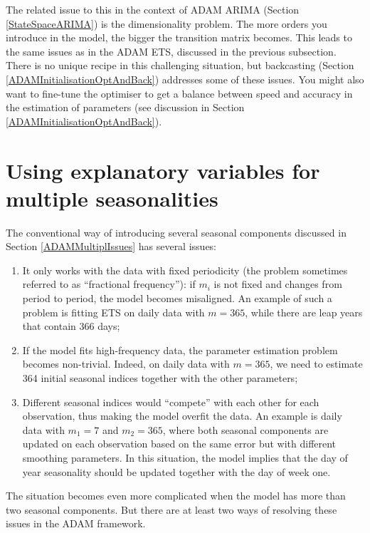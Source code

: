 \documentclass[
]{book}
\providecommand{\tightlist}{%
  \setlength{\itemsep}{0pt}\setlength{\parskip}{0pt}}
\theoremstyle{definition}
\theoremstyle{definition}
\theoremstyle{definition}
\theoremstyle{definition}
\theoremstyle{remark}
\begin{document}
The related issue to this in the context of ADAM ARIMA (Section \ref{StateSpaceARIMA}) is the dimensionality problem. The more orders you introduce in the model, the bigger the transition matrix becomes. This leads to the same issues as in the ADAM ETS, discussed in the previous subsection. There is no unique recipe in this challenging situation, but backcasting (Section \ref{ADAMInitialisationOptAndBack}) addresses some of these issues. You might also want to fine-tune the optimiser to get a balance between speed and accuracy in the estimation of parameters (see discussion in Section \ref{ADAMInitialisationOptAndBack}).

\hypertarget{ETSXMultipleSeasonality}{%
\section{Using explanatory variables for multiple seasonalities}\label{ETSXMultipleSeasonality}}

The conventional way of introducing several seasonal components discussed in Section \ref{ADAMMultiplIssues} has several issues:

\begin{enumerate}
\def\labelenumi{\arabic{enumi}.}
\tightlist
\item
  It only works with the data with fixed periodicity (the problem sometimes referred to as ``fractional frequency''): if \(m_i\) is not fixed and changes from period to period, the model becomes misaligned. An example of such a problem is fitting ETS on daily data with \(m=365\), while there are leap years that contain 366 days;
\item
  If the model fits high-frequency data, the parameter estimation problem becomes non-trivial. Indeed, on daily data with \(m=365\), we need to estimate 364 initial seasonal indices together with the other parameters;
\item
  Different seasonal indices would ``compete'' with each other for each observation, thus making the model overfit the data. An example is daily data with \(m_1=7\) and \(m_2=365\), where both seasonal components are updated on each observation based on the same error but with different smoothing parameters. In this situation, the model implies that the day of year seasonality should be updated together with the day of week one.
\end{enumerate}

The situation becomes even more complicated when the model has more than two seasonal components. But there are at least two ways of resolving these issues in the ADAM framework.
\end{document}
